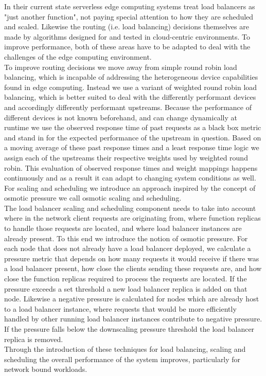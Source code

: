 \documentclass[draft,final]{vutinfth} %
\begin{document}
In their current state serverless edge computing systems treat load balancers as "just another function", not paying special attention to how they are scheduled and scaled.
Likewise the routing (i.e. load balancing) decisions themselves are made by algorithms designed for and tested in cloud-centric environments.
To improve performance, both of these areas have to be adapted to deal with the challenges of the edge computing environment.\\
To improve routing decisions we move away from simple round robin load balancing, which is incapable of addressing the heterogeneous device capabilities found in edge computing.
Instead we use a variant of weighted round robin load balancing, which is better suited to deal with the differently performant devices and accordingly differently performant upstreams.
Because the performance of different devices is not known beforehand, and can change dynamically at runtime we use the observed response time of past requests as a black box metric and stand in for the expected performance of the upstream in question.
Based on a moving average of these past response times and a least response time logic we assign each of the upstreams their respective weights used by weighted round robin.
This evaluation of observed response times and weight mappings happens continuously and as a result it can adapt to changing system conditions as well.
For scaling and scheduling we introduce an approach inspired by the concept of osmotic pressure we call osmotic scaling and scheduling.\\
The load balancer scaling and scheduling component needs to take into account where in the network client requests are originating from, where function replicas to handle those requests are located, and where load balancer instances are already present.
To this end we introduce the notion of osmotic pressure.
For each node that does not already have a load balancer deployed, we calculate a pressure metric that depends on how many requests it would receive if there was a load balancer present, how close the clients sending these requests are, and how close the function replicas required to process the requests are located.
If the pressure exceeds a set threshold a new load balancer replica is added on that node.
Likewise a negative pressure is calculated for nodes which are already host to a load balancer instance, where requests that would be more efficiently handled by other running load balancer instances contribute to negative pressure.
If the pressure falls below the downscaling pressure threshold the load balancer replica is removed.\\
Through the introduction of these techniques for load balancing, scaling and scheduling the overall performance of the system improves, particularly for network bound workloads.
\end{document}
